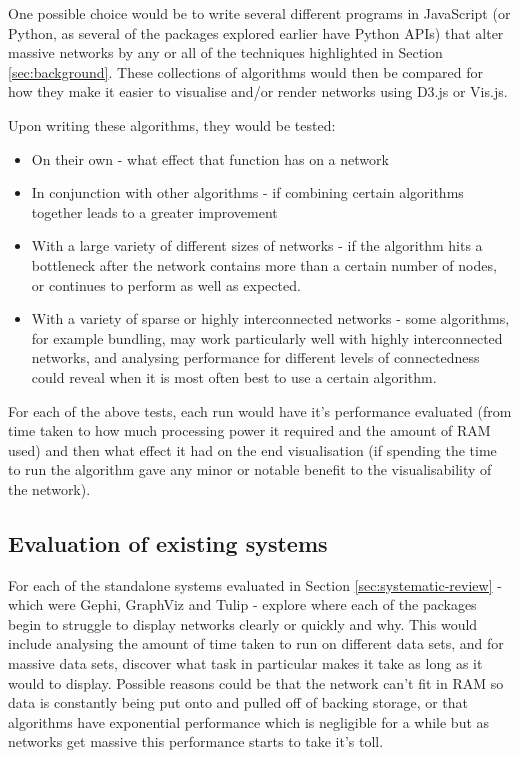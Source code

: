 \documentclass[../dissertation.tex]{subfiles}
\begin{document}
One possible choice would be to write several different programs in JavaScript (or Python, as several of the packages explored earlier have Python APIs) that alter massive networks by any or all of the techniques highlighted in Section \ref{sec:background}. These collections of algorithms would then be compared for how they make it easier to visualise and/or render networks using D3.js or Vis.js. 

Upon writing these algorithms, they would be tested:
\begin{itemize}
    \item On their own - what effect that function has on a network
    \item In conjunction with other algorithms - if combining certain algorithms together leads to a greater improvement
    \item With a large variety of different sizes of networks - if the algorithm hits a bottleneck after the network contains more than a certain number of nodes, or continues to perform as well as expected.
    \item With a variety of sparse or highly interconnected networks - some algorithms, for example bundling, may work particularly well with highly interconnected networks, and analysing performance for different levels of connectedness could reveal when it is most often best to use a certain algorithm.
\end{itemize}

For each of the above tests, each run would have it's performance evaluated (from time taken to how much processing power it required and the amount of RAM used) and then what effect it had on the end visualisation (if spending the time to run the algorithm gave any minor or notable benefit to the visualisability of the network).

\subsection{Evaluation of existing systems}

For each of the standalone systems evaluated in Section \ref{sec:systematic-review} - which were Gephi, GraphViz and Tulip - explore where each of the packages begin to struggle to display networks clearly or quickly and why. This would include analysing the amount of time taken to run on different data sets, and for massive data sets, discover what task in particular makes it take as long as it would to display. Possible reasons could be that the network can't fit in RAM so data is constantly being put onto and pulled off of backing storage, or that algorithms have exponential performance which is negligible for a while but as networks get massive this performance starts to take it's toll. 
\end{document}
